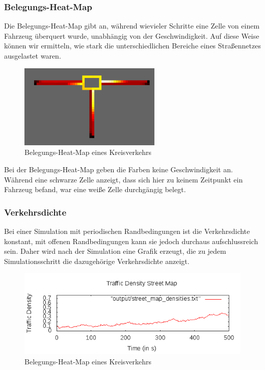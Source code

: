 \documentclass[10pt, a4paper]{article}
\begin{document}
\subsubsection{Belegungs-Heat-Map}
\label{subsubsec:occupancymap}
Die Belegungs-Heat-Map gibt an, während wievieler Schritte eine Zelle von einem Fahrzeug überquert wurde, unabhängig von der Geschwindigkeit. Auf diese Weise können wir ermitteln, wie stark die unterschiedlichen Bereiche eines Straßennetzes ausgelastet waren.

\begin{figure}[h!]
	\centering
	\includegraphics[height=4cm]{img/vis_roundabout_occupancy_heat_map}
	\caption{Belegungs-Heat-Map eines Kreisverkehrs}
	\label{fig:occupancyMapRoundabout}
\end{figure}
Bei der Belegungs-Heat-Map geben die Farben keine Geschwindigkeit an. Während eine schwarze Zelle anzeigt, dass sich hier zu keinem Zeitpunkt ein Fahrzeug befand, war eine weiße Zelle durchgängig belegt.

\subsubsection{Verkehrsdichte}
\label{subsubsec:verkehrsdichte}

Bei einer Simulation mit periodischen Randbedingungen ist die Verkehrsdichte konstant, mit offenen Randbedingungen kann sie jedoch durchaus aufschlussreich sein. Daher wird nach der Simulation eine Grafik erzeugt, die zu jedem Simulationsschritt die dazugehörige Verkehrsdichte anzeigt.
\begin{figure}[h!]
	\centering
	\includegraphics[width=\textwidth]{img/vis_street_map_densities}
	\caption{Belegungs-Heat-Map eines Kreisverkehrs}
	\label{fig:occupancyMapRoundabout}
\end{figure}
\end{document}
